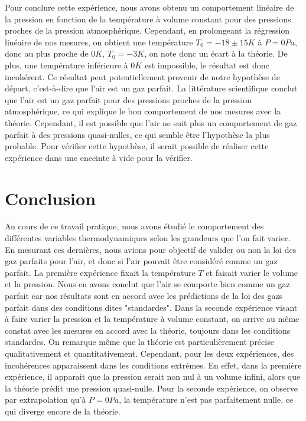 \documentclass[12pt]{article}
\begin{document}
\newpage
Pour conclure cette expérience, nous avons obtenu un comportement linéaire de la pression en fonction de la température à volume constant pour des pressions proches de la pression atmosphérique.
Cependant, en prolongeant la régression linéaire de nos mesures, on obtient une température $T_0 = -18 \pm 15 K$ à $P=0Pa$, donc au plus proche de $0K$, $T_0 = -3K$, on note donc un écart à la théorie.
De plus, une température inférieure à $0K$ est impossible, le résultat est donc incohérent. Ce résultat peut potentiellement provenir de notre hypothèse de départ, c'est-à-dire que l'air est un gaz parfait. 
La littérature scientifique conclut que l'air est un gaz parfait pour des pressions proches de la pression atmosphérique, ce qui explique le bon comportement
de nos mesures avec la théorie. Cependant, il est possible que l'air ne suit plus un comportement de gaz parfait à des pressions quasi-nulles, ce qui semble être l'hypothèse la plus probable. 
Pour vérifier cette hypothèse, il serait possible de réaliser cette expérience dans une enceinte à vide pour la vérifier. 

\section{Conclusion}
Au cours de ce travail pratique, nous avons étudié le comportement des différentes variables thermodynamiques selon les grandeurs que l'on fait varier. En mesurant ces dernières,
nous avions pour objectif de valider ou non la loi des gaz parfaits pour l'air, et donc si l'air pouvait être considéré comme un gaz parfait. La première expérience fixait la température $T$
et faisait varier le volume et la pression. Nous en avons conclut que l'air se comporte bien comme un gaz parfait car nos résultats sont en accord avec les prédictions de la loi des gazs parfait dans des conditions dites "standardes".
Dans la seconde expérience visant à faire varier la pression et la température à volume constant, on arrive au même constat avec les mesures en accord avec la théorie, toujours dans les conditions standardes. On remarque même que la théorie est particulièrement
précise qualitativement et quantitativement. Cependant, pour les deux expériences, des incohérences apparaissent dans les conditions extrêmes. En effet, dans la première expérience, il apparait que la pression serait non nul à un volume infini, alors que la théorie
prédit une pression quasi-nulle. Pour la seconde expérience, on observe par extrapolation qu'à $P=0Pa$, la température n'est pas parfaitement nulle, ce qui diverge encore de la théorie. 
\end{document}
